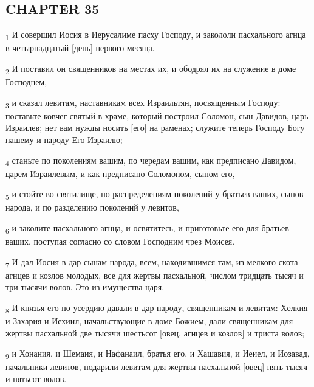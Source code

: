 \subsection{CHAPTER 35}
\begin{tcolorbox}
\textsubscript{1} И совершил Иосия в Иерусалиме пасху Господу, и закололи пасхального агнца в четырнадцатый [день] первого месяца.
\end{tcolorbox}
\begin{tcolorbox}
\textsubscript{2} И поставил он священников на местах их, и ободрял их на служение в доме Господнем,
\end{tcolorbox}
\begin{tcolorbox}
\textsubscript{3} и сказал левитам, наставникам всех Израильтян, посвященным Господу: поставьте ковчег святый в храме, который построил Соломон, сын Давидов, царь Израилев; нет вам нужды носить [его] на раменах; служите теперь Господу Богу нашему и народу Его Израилю;
\end{tcolorbox}
\begin{tcolorbox}
\textsubscript{4} станьте по поколениям вашим, по чередам вашим, как предписано Давидом, царем Израилевым, и как предписано Соломоном, сыном его,
\end{tcolorbox}
\begin{tcolorbox}
\textsubscript{5} и стойте во святилище, по распределениям поколений у братьев ваших, сынов народа, и по разделению поколений у левитов,
\end{tcolorbox}
\begin{tcolorbox}
\textsubscript{6} и заколите пасхального агнца, и освятитесь, и приготовьте его для братьев ваших, поступая согласно со словом Господним чрез Моисея.
\end{tcolorbox}
\begin{tcolorbox}
\textsubscript{7} И дал Иосия в дар сынам народа, всем, находившимся там, из мелкого скота агнцев и козлов молодых, все для жертвы пасхальной, числом тридцать тысяч и три тысячи волов. Это из имущества царя.
\end{tcolorbox}
\begin{tcolorbox}
\textsubscript{8} И князья его по усердию давали в дар народу, священникам и левитам: Хелкия и Захария и Иехиил, начальствующие в доме Божием, дали священникам для жертвы пасхальной две тысячи шестьсот [овец, агнцев и козлов] и триста волов;
\end{tcolorbox}
\begin{tcolorbox}
\textsubscript{9} и Хонания, и Шемаия, и Нафанаил, братья его, и Хашавия, и Иеиел, и Иозавад, начальники левитов, подарили левитам для жертвы пасхальной [овец] пять тысяч и пятьсот волов.
\end{tcolorbox}
